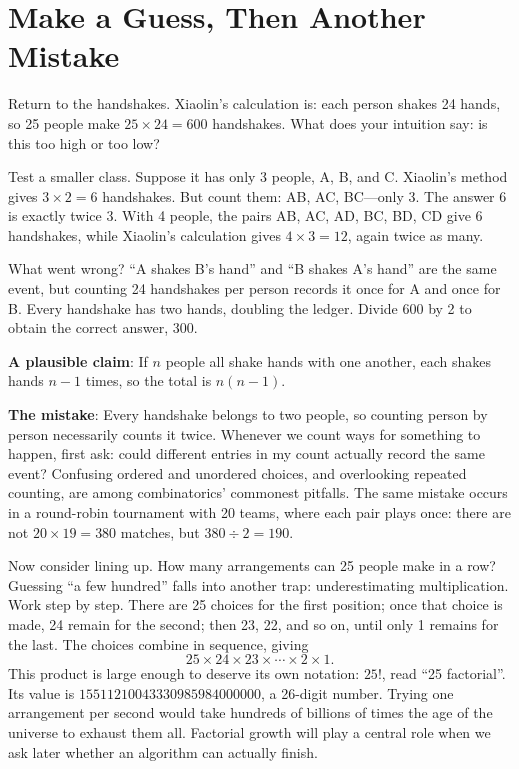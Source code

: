 \section{Make a Guess, Then Another Mistake}

Return to the handshakes. Xiaolin's calculation is: each person shakes 24 hands, so 25 people make $25\times 24=600$ handshakes. What does your intuition say: is this too high or too low?

Test a smaller class. Suppose it has only 3 people, A, B, and C. Xiaolin's method gives $3\times 2=6$ handshakes. But count them: AB, AC, BC---only 3. The answer 6 is exactly twice 3. With 4 people, the pairs AB, AC, AD, BC, BD, CD give 6 handshakes, while Xiaolin's calculation gives $4\times 3=12$, again twice as many.

What went wrong? ``A shakes B's hand'' and ``B shakes A's hand'' are the same event, but counting 24 handshakes per person records it once for A and once for B. Every handshake has two hands, doubling the ledger. Divide 600 by 2 to obtain the correct answer, 300.

\begin{fanli}
\textbf{A plausible claim}: If $n$ people all shake hands with one another, each shakes hands $n-1$ times, so the total is $n(n-1)$.

\textbf{The mistake}: Every handshake belongs to two people, so counting person by person necessarily counts it twice. Whenever we count ways for something to happen, first ask: could different entries in my count actually record the same event? Confusing ordered and unordered choices, and overlooking repeated counting, are among combinatorics' commonest pitfalls. The same mistake occurs in a round-robin tournament with 20 teams, where each pair plays once: there are not $20\times 19=380$ matches, but $380\div 2=190$.
\end{fanli}

Now consider lining up. How many arrangements can 25 people make in a row? Guessing ``a few hundred'' falls into another trap: underestimating multiplication. Work step by step. There are 25 choices for the first position; once that choice is made, 24 remain for the second; then 23, 22, and so on, until only 1 remains for the last. The choices combine in sequence, giving
\[
25\times 24\times 23\times\cdots\times 2\times 1.
\]
This product is large enough to deserve its own notation: $25!$, read ``25 factorial''. Its value is $15511210043330985984000000$, a 26-digit number. Trying one arrangement per second would take hundreds of billions of times the age of the universe to exhaust them all. Factorial growth will play a central role when we ask later whether an algorithm can actually finish.

